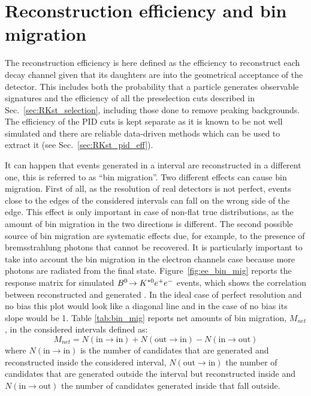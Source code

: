 \section{Reconstruction efficiency and bin migration}

The reconstruction efficiency is here defined as the efficiency to reconstruct
each decay channel given that its daughters are into the geometrical acceptance
of the detector. This includes both the probability that a particle generates
observable signatures and the efficiency of all the preselection cuts described in Sec.~\ref{sec:RKst_selection},
including those done to remove peaking backgrounds. 
The efficiency of the PID cuts is kept separate as it is known to be not well simulated
and there are reliable data-driven methods which can be used to extract it (see Sec.~\ref{sec:RKst_pid_eff}).

It can happen that events generated in a \qsq interval are reconstructed in a different one,
this is referred to as ``bin migration''. Two different effects can cause bin migration.
First of all, as the resolution of real detectors is not perfect, events close to the edges
of the considered intervals can fall on the wrong side of the edge. This effect is only important
in case of non-flat true distributions, as the amount of bin migration in the two directions is different.
The second possible source of bin migration are systematic effects due, for example,
to the presence of bremsstrahlung photons that cannot be recovered.
It is particularly important to take into account the bin migration in the electron channels case 
because more photons are radiated from the final state.
Figure~\ref{fig:ee_bin_mig} reports the response matrix for simulated ${{B}^0}\!\rightarrow {\ensuremath{{K}^{*0}}}e^+ e^-$ events,
which shows the correlation between reconstructed and generated \qsq. In the ideal case of
perfect resolution and no bias this plot would look like a diagonal line and in the case of no bias
its slope would be 1.
Table \ref{tab:bin_mig} reports net amounts of bin migration, $M_{net}$, in the considered \qsq intervals defined as:
%
\begin{equation}
M_{net} = N(\text{in} \to \text{in}) + N(\text{out} \to \text{in}) - N(\text{in} \to \text{out}) 
\end{equation}
%
\noindent
where $N(\text{in} \to \text{in})$ is the number of candidates that are generated and
reconstructed inside the considered interval, $N(\text{out} \to \text{in})$ the number of 
candidates that are generated outside the interval but reconstructed inside and
$N(\text{in} \to \text{out})$ the number of candidates generated inside that fall outside.

